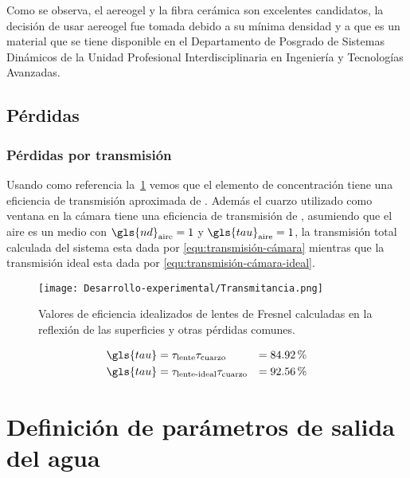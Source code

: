 			Como se observa, el aereogel y la fibra cerámica son excelentes candidatos, la decisión de usar aereogel fue tomada debido a su mínima densidad y a que es un material que se tiene disponible en el Departamento de Posgrado de Sistemas Dinámicos de la Unidad Profesional Interdisciplinaria en Ingeniería y Tecnologías Avanzadas.
			
		\subsection{Pérdidas}
			
			\subsubsection{Pérdidas por transmisión}
				
				Usando como referencia la~\cref{fig:Transmitancia} vemos que el elemento de concentración tiene una eficiencia de transmisión aproximada de . Además el cuarzo utilizado como ventana en la cámara tiene una eficiencia de transmisión de , asumiendo que el aire es un medio con $\gls{nd}_{\text{aire}} = 1$ y $\gls{tau}_{\text{aire}} = 1$, la transmisión total calculada del sistema esta dada por \eqref{equ:transmisión-cámara} mientras que la transmisión ideal esta dada por \cref{equ:transmisión-cámara-ideal}.
		
				\begin{figure}[H]
					\centering
					\texttt{[image: Desarrollo-experimental/Transmitancia.png]}
					\caption{Valores de eficiencia idealizados de lentes de Fresnel calculadas en la reflexión de las superficies y otras pérdidas comunes.}
					\label{fig:Transmitancia}
				\end{figure}
				
				\begin{align}
					\gls{tau} &= \tau_{\text{lente}}\tau_{\text{cuarzo}} &= \percent{84.92}\label{equ:transmisión-cámara} \\
					\gls{tau} &= \tau_{\text{lente-ideal}}\tau_{\text{cuarzo}} &= \percent{92.56} \label{equ:transmisión-cámara-ideal}
				\end{align}
	
	\section{Definición de parámetros de salida del agua}
		
